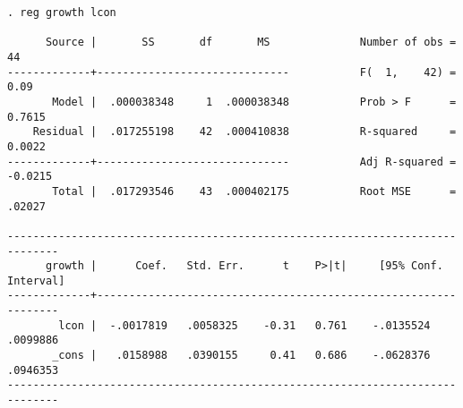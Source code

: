 
\begin{frame}[fragile,label=statareg]
\scriptsize
\begin{columns}
    \column{\dimexpr\paperwidth-20pt}
\begin{verbatim}
. reg growth lcon

      Source |       SS       df       MS              Number of obs =      44
-------------+------------------------------           F(  1,    42) =    0.09
       Model |  .000038348     1  .000038348           Prob > F      =  0.7615
    Residual |  .017255198    42  .000410838           R-squared     =  0.0022
-------------+------------------------------           Adj R-squared = -0.0215
       Total |  .017293546    43  .000402175           Root MSE      =  .02027

------------------------------------------------------------------------------
      growth |      Coef.   Std. Err.      t    P>|t|     [95% Conf. Interval]
-------------+----------------------------------------------------------------
        lcon |  -.0017819   .0058325    -0.31   0.761    -.0135524    .0099886
       _cons |   .0158988   .0390155     0.41   0.686    -.0628376    .0946353
------------------------------------------------------------------------------

\end{verbatim}
    
\end{columns}
\end{frame}



